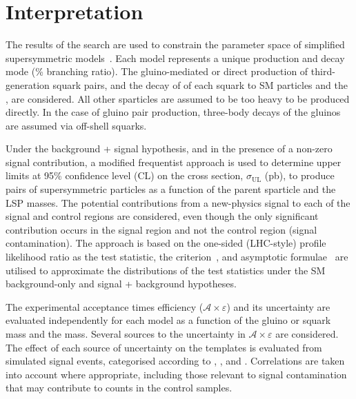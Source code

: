 \clearpage
\section{Interpretation}
\label{sec:interpretation}

The results of the search are used to constrain the parameter space of
simplified supersymmetric models~\cite{Alwall:2008ag, Alwall:2008va,
  sms}. Each model represents a unique production and decay mode (\% branching ratio). The gluino-mediated or direct production of
third-generation squark pairs, and the decay of of each squark to SM
particles and the \chiz, are considered. All other sparticles are
assumed to be too heavy to be produced directly. In the case of gluino
pair production, three-body decays of the gluinos are assumed via
off-shell squarks.

Under the background + signal hypothesis, and in the presence of a
non-zero signal contribution, a modified frequentist approach is used
to determine upper limits at 95\% confidence level (CL) on the cross
section, $\sigma_\text{UL}$ (pb), to produce pairs of supersymmetric
particles as a function of the parent sparticle and the LSP
masses. The potential contributions from a new-physics signal to each
of the signal and control regions are considered, even though the only
significant contribution occurs in the signal region and not the
control region (\ie signal contamination). The approach is based on
the one-sided (LHC-style) profile likelihood ratio as the test
statistic, the \cls criterion~\cite{junk, read}, and asymptotic
formulae~\cite{Cowan:2010js} are utilised to approximate the
distributions of the test statistics under the SM background-only and
signal + background hypotheses. 

The experimental acceptance times efficiency
($\mathcal{A}\times\varepsilon$) and its uncertainty are evaluated
independently for each model as a function of the gluino or squark
mass and the \chiz mass. Several sources to the uncertainty in
$\mathcal{A}\times\varepsilon$ are considered. The effect of each
source of uncertainty on the \HTmiss templates is evaluated from
simulated signal events, categorised according to \njet, \nb, and
\scalht. Correlations are taken into account where appropriate,
including those relevant to signal contamination that may contribute
to counts in the control samples. 

